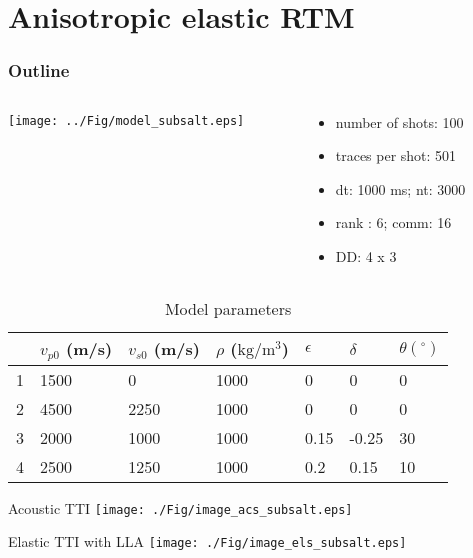 \documentclass[aspectratio=169]{beamer}
\begin{document}
\section{Anisotropic elastic RTM}
\begin{frame}
\frametitle{Outline}
\tableofcontents[currentsection]
\end{frame}
\begin{frame}
\begin{columns}
  \begin{column}{0.6\textwidth}
  \texttt{[image: ../Fig/model\_subsalt.eps]}
  \end{column}
  \begin{column}{0.4\textwidth}
\begin{itemize}
\item{number of shots: 100}
\item{traces per shot: 501}
\item{dt: 1000 ms; nt: 3000}
\item{rank : 6; comm: 16}
\item{DD: 4 x 3}
\end{itemize}
  \end{column}
\end{columns}

\begin{table}[]
\centering
\begin{tabular}{|l|l|l|l|l|l|l|}
\hline
  &  $v_{p0}$ (m/s) & $v_{s0}$ (m/s) & $\rho$ ($\mathrm{kg/m^3}$) & $\epsilon$ & $\delta$  & $\theta(^\circ)$ \\ \hline
1 & 1500     & 0        & 1000        & 0    & 0     & 0    \\ \hline
2 & 4500     & 2250     & 1000        & 0    & 0     & 0    \\ \hline
3 & 2000     & 1000     & 1000        & 0.15 & -0.25 & 30   \\ \hline
4 & 2500     & 1250     & 1000        & 0.2  & 0.15  & 10   \\ \hline
\end{tabular}
\caption{Model parameters}
\end{table}
\end{frame}
\begin{frame}{Acoustic TTI}
\center
  \texttt{[image: ./Fig/image\_acs\_subsalt.eps]}
\end{frame}
\begin{frame}{Elastic TTI with LLA}
\center
  \texttt{[image: ./Fig/image\_els\_subsalt.eps]}
\end{frame}
\end{document}
